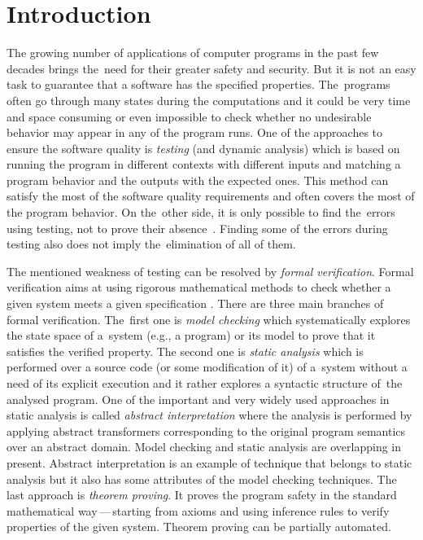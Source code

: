 \chapter{Introduction}

The growing number of applications of computer programs in the past few decades brings
the~need for their greater safety and security.
But it is not an easy task to guarantee that a software has the specified properties.
The~programs often go through many states during the computations
and it could be very time and space consuming or even impossible to check whether no undesirable behavior
may appear in any of the program runs.
One of the approaches to ensure the software quality is \emph{testing} (and dynamic analysis) which is based
on running the program in different contexts with different inputs
and matching a program behavior and the outputs with the expected ones.
This method can satisfy the most of the software quality requirements and often covers the most of the program behavior.
On the~other side, it is only possible to find the~errors using testing, not to prove their absence~\cite{dijkstra}.
Finding some of the errors during testing also does not imply the~elimination of all of them.

The mentioned weakness of testing can be resolved by \emph{formal verification}.
Formal verification aims at using rigorous mathematical methods to check whether a given system meets a given specification \cite{fav:lecture}.
There are three main branches of formal verification.
The~first one is \emph{model checking} which systematically explores the state space of a~system (e.g., a program) or its model to
prove that it satisfies the verified property.
The second one is \emph{static analysis} which is performed over a source code (or some modification of it) of a~system
without a need of its explicit execution and it rather explores a syntactic structure of~the analysed program.
One of the important and very widely used approaches in static analysis is called \emph{abstract interpretation} where the analysis is performed by
applying abstract transformers corresponding to the original program semantics over an abstract domain.
Model checking and static analysis are overlapping in present.
Abstract interpretation is an example of technique that belongs to static analysis
but it also has some attributes of the model checking techniques.
The last approach is \emph{theorem proving}.
It proves the program safety in the standard mathematical way\,---\,starting
from axioms and using inference rules to verify properties of the given system.
Theorem proving can be partially automated.

